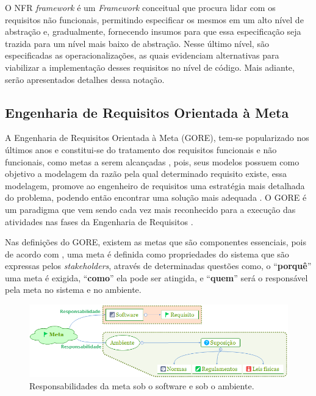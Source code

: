 O NFR \textit{framework} é um \textit{Framework} conceitual que procura lidar com os requisitos não funcionais, permitindo especificar os mesmos em um alto nível de abstração e, gradualmente, fornecendo insumos para que essa especificação seja trazida para um nível mais baixo de abstração. Nesse último nível, são especificadas as operacionalizações, as quais evidenciam alternativas para viabilizar a implementação desses requisitos no nível de código. Mais adiante, serão apresentados detalhes dessa notação.

\subsection{Engenharia de Requisitos Orientada à Meta}
\label{subsec:orientacaoMeta}

A Engenharia de Requisitos Orientada à Meta (GORE), tem-se popularizado nos últimos anos e constitui-se do tratamento dos requisitos funcionais e não funcionais, como metas a serem alcançadas \cite{van2001goal}, pois, seus modelos possuem como objetivo a modelagem da razão pela qual determinado requisito existe, essa modelagem, promove ao engenheiro de requisitos uma estratégia mais detalhada do problema, podendo então encontrar uma solução mais adequada \cite{van2001goal}\cite{chung2012non}. O GORE é um paradigma que vem sendo cada vez mais reconhecido para a execução das atividades nas fases da Engenharia de Requisitos \cite{van2001goal}.

Nas definições do GORE, existem as metas que são componentes essenciais, pois de acordo com \cite{van2001goal}, uma meta é definida como propriedades do sistema que são expressas pelos \textit{stakeholders}, através de determinadas questões como, o “\textbf{porquê}” uma meta é exigida, “\textbf{como}” ela pode ser atingida, e “\textbf{quem}” será o responsável pela meta no sistema e no ambiente.

\begin{figure}[h]
	\centering
	\includegraphics[keepaspectratio=true,scale=0.8]{figuras/GORE.png}
	\caption{Responsabilidades da meta sob o software e sob o ambiente.}
	\label{Gore}
\end{figure}


